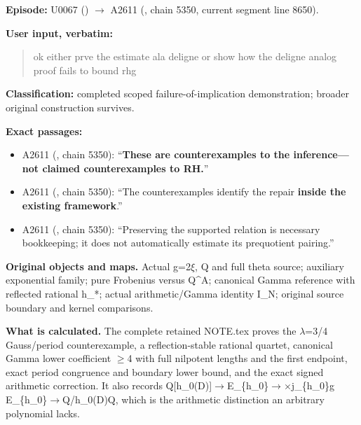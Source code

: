 \documentclass[10pt,a4paper,oneside]{report}
\providecommand{\tightlist}{\setlength{\itemsep}{0pt}\setlength{\parskip}{0pt}}
\begin{document}
\textbf{Episode:} U0067
(\protect{})
\allowbreak{}\ensuremath{→}\allowbreak{} A2611
(\protect{}, chain 5350,
current segment line 8650).

\textbf{User input, verbatim:}

\begin{quote}
ok either prve the estimate ala deligne or show how the deligne analog
proof fails to bound rhg
\end{quote}

\textbf{Classification:} completed scoped failure-of-implication
demonstration; broader original construction survives.

\textbf{Exact passages:}

\begin{itemize}
\tightlist
\item
  A2611 (\protect{}, chain
  5350): ``\textbf{These are counterexamples to the inference---not
  claimed counterexamples to RH.}''
\item
  A2611 (\protect{}, chain
  5350): ``The counterexamples identify the repair \textbf{inside the
  existing framework}.''
\item
  A2611 (\protect{}, chain
  5350): ``Preserving the supported relation is necessary bookkeeping;
  it does not automatically estimate its prequotient pairing.''
\end{itemize}

\textbf{Original objects and maps.} Actual
g=2\allowbreak{}\ensuremath{ξ}\allowbreak{}, Q and full theta source;
auxiliary exponential family; pure Frobenius versus Q\^{}A; canonical
Gamma reference with reflected rational h\_*; actual arithmetic/Gamma
identity I\_N; original source boundary and kernel comparisons.

\textbf{What is calculated.} The complete retained NOTE.tex proves the
\allowbreak{}\ensuremath{λ}\allowbreak{}=3/4 Gauss/period
counterexample, a reflection-stable rational quartet, canonical Gamma
lower coefficient \allowbreak{}\ensuremath{≥}\allowbreak{}4 with full
nilpotent lengths and the first endpoint, exact period congruence and
boundary lower bound, and the exact signed arithmetic correction. It
also records
Q[h\_0(D)]\allowbreak{}\ensuremath{→}\allowbreak{}E\_\{h\_0\}\allowbreak{}\ensuremath{→}\allowbreak{}\allowbreak{}\ensuremath{×}\allowbreak{}j\_\{h\_0\}g
E\_\{h\_0\}\allowbreak{}\ensuremath{→}\allowbreak{}Q/h\_0(D)Q, which is
the arithmetic distinction an arbitrary polynomial lacks.
\end{document}
